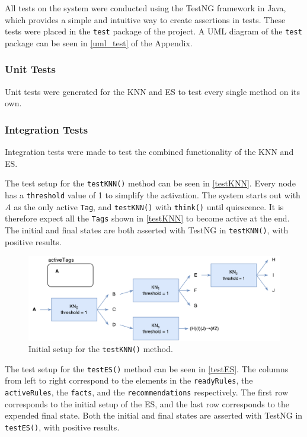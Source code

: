 \documentclass[titlepage,11pt]{article}
\newcommand{\code}[1]{\texttt{#1}}
\begin{document}
All tests on the system were conducted using the TestNG framework in Java, which provides a simple and intuitive way to create assertions in tests. These tests were placed in the \code{test} package of the project. A UML diagram of the \code{test} package can be seen in \autoref{uml_test} of the Appendix.

\subsubsection{Unit Tests}

Unit tests were generated for the KNN and ES to test every single method on its own.

\subsubsection{Integration Tests}

Integration tests were made to test the combined functionality of the KNN and ES.

The test setup for the \code{testKNN()} method can be seen in \autoref{testKNN}. Every node has a \code{threshold} value of 1 to simplify the activation. The system starts out with $A$ as the only active \code{Tag}, and \code{testKNN()} with \code{think()} until quiescence. It is therefore expect all the \code{Tags} shown in \autoref{testKNN} to become active at the end. The initial and final states are both asserted with TestNG in \code{testKNN()}, with positive results.

\begin{figure}[!htb]
	\includegraphics[width=\textwidth]{figures/testKNN.pdf}
	\caption[Setup for the \code{testKNN()} method.]
	{Initial setup for the \code{testKNN()} method.}
	\label{testKNN}
\end{figure}

The test setup for the \code{testES()} method can be seen in \autoref{testES}. The columns from left to right correspond to the elements in the \code{readyRules}, the \code{activeRules}, the \code{facts}, and the \code{recommendations} respectively. The first row corresponds to the initial setup of the ES, and the last row corresponds to the expended final state. Both the initial and final states are asserted with TestNG in \code{testES()}, with positive results.
\end{document}
